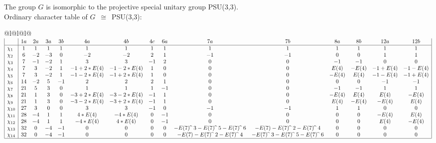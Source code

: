 \documentclass[varwidth=\maxdimen,border=10]{standalone}
\begin{document}
The group $G$ is isomorphic to the projective special unitary group PSU(3,3).\\
Ordinary character table of $G$\ $\cong$\ PSU(3,3):\\
\begin{center}
\begin{tabular}{@{}l@{}l@{}l@{}}
\hline
\(\begin{array}{|l|cccccccccccccc|}
  & 1a & 2a & 3a & 3b & 4a & 4b & 4c & 6a & 7a & 7b & 8a & 8b & 12a & 12b\\ \hline
\chi_{1} & 1 & 1 & 1 & 1 & 1 & 1 & 1 & 1 & 1 & 1 & 1 & 1 & 1 & 1\\
\chi_{2} & 6 & -2 & -3 & 0 & -2 & -2 & 2 & 1 & -1 & -1 & 0 & 0 & 1 & 1\\
\chi_{3} & 7 & -1 & -2 & 1 & 3 & 3 & -1 & 2 & 0 & 0 & -1 & -1 & 0 & 0\\
\chi_{4} & 7 & 3 & -2 & 1 & -1+2*E(4) & -1-2*E(4) & 1 & 0 & 0 & 0 & E(4) & -E(4) & -1+E(4) & -1-E(4)\\
\chi_{5} & 7 & 3 & -2 & 1 & -1-2*E(4) & -1+2*E(4) & 1 & 0 & 0 & 0 & -E(4) & E(4) & -1-E(4) & -1+E(4)\\
\chi_{6} & 14 & -2 & 5 & -1 & 2 & 2 & 2 & 1 & 0 & 0 & 0 & 0 & -1 & -1\\
\chi_{7} & 21 & 5 & 3 & 0 & 1 & 1 & 1 & -1 & 0 & 0 & -1 & -1 & 1 & 1\\
\chi_{8} & 21 & 1 & 3 & 0 & -3+2*E(4) & -3-2*E(4) & -1 & 1 & 0 & 0 & -E(4) & E(4) & E(4) & -E(4)\\
\chi_{9} & 21 & 1 & 3 & 0 & -3-2*E(4) & -3+2*E(4) & -1 & 1 & 0 & 0 & E(4) & -E(4) & -E(4) & E(4)\\
\chi_{10} & 27 & 3 & 0 & 0 & 3 & 3 & -1 & 0 & -1 & -1 & 1 & 1 & 0 & 0\\
\chi_{11} & 28 & -4 & 1 & 1 & 4*E(4) & -4*E(4) & 0 & -1 & 0 & 0 & 0 & 0 & -E(4) & E(4)\\
\chi_{12} & 28 & -4 & 1 & 1 & -4*E(4) & 4*E(4) & 0 & -1 & 0 & 0 & 0 & 0 & E(4) & -E(4)\\
\chi_{13} & 32 & 0 & -4 & -1 & 0 & 0 & 0 & 0 & -E(7) \widehat{\ }\ {3}-E(7) \widehat{\ }\ {5}-E(7) \widehat{\ }\ {6} & -E(7)-E(7) \widehat{\ }\ {2}-E(7) \widehat{\ }\ {4} & 0 & 0 & 0 & 0\\
\chi_{14} & 32 & 0 & -4 & -1 & 0 & 0 & 0 & 0 & -E(7)-E(7) \widehat{\ }\ {2}-E(7) \widehat{\ }\ {4} & -E(7) \widehat{\ }\ {3}-E(7) \widehat{\ }\ {5}-E(7) \widehat{\ }\ {6} & 0 & 0 & 0 & 0\\
\hline
\end{array}\)\\
\end{tabular}
\end{center}
\end{document}
